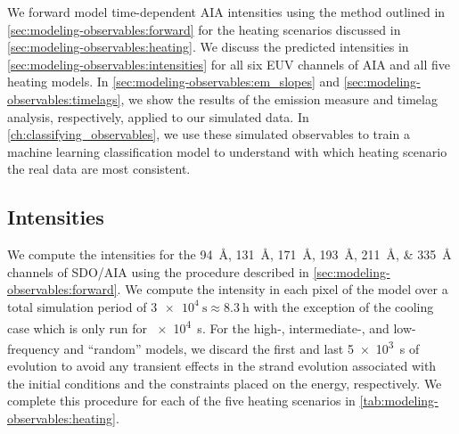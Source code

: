 We forward model time-dependent AIA intensities using the method outlined in \autoref{sec:modeling-observables:forward} for the heating scenarios discussed in \autoref{sec:modeling-observables:heating}. We discuss the predicted intensities in \autoref{sec:modeling-observables:intensities} for all six EUV channels of AIA and all five heating models. In \autoref{sec:modeling-observables:em_slopes} and \autoref{sec:modeling-observables:timelags}, we show the results of the emission measure and timelag analysis, respectively, applied to our simulated data. In \autoref{ch:classifying_observables}, we use these simulated observables to train a machine learning classification model to understand with which heating scenario the real data are most consistent.

\subsection{Intensities}\label{sec:modeling-observables:intensities}

We compute the intensities for the \SIlist{94;131;171;193;211;335}{\angstrom} channels of SDO/AIA using the procedure described in \autoref{sec:modeling-observables:forward}. We compute the intensity in each pixel of the model \AR{} over a total simulation period of $\SI{3e4}{\second}\approx\SI{8.3}{\hour}$ with the exception of the cooling case which is only run for \SI{e4}{\second}. For the high-, intermediate-, and low-frequency and ``random'' models, we discard the first and last \SI{5e3}{\second} of evolution to avoid any transient effects in the strand evolution associated with the initial conditions and the constraints placed on the energy, respectively. We complete this procedure for each of the five heating scenarios in \autoref{tab:modeling-observables:heating}.

